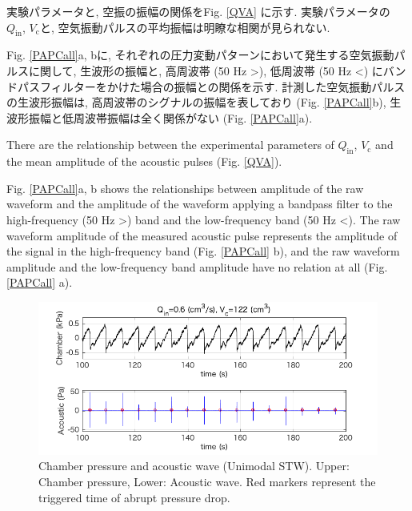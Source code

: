 \documentclass[12pt]{article}
\begin{document}
実験パラメータと, 空振の振幅の関係をFig. \ref{QVA} に示す. 
実験パラメータの $Q_\mathrm{in}$, $V_\mathrm{c}$と, 空気振動パルスの平均振幅は明瞭な相関が見られない. 

Fig. \ref{PAPCall}a, bに, それぞれの圧力変動パターンにおいて発生する空気振動パルスに関して, 生波形の振幅と, 高周波帯 (50 Hz >), 低周波帯 (50 Hz <) にバンドパスフィルターをかけた場合の振幅との関係を示す. 
計測した空気振動パルスの生波形振幅は, 高周波帯のシグナルの振幅を表しており (Fig. \ref{PAPCall}b), 生波形振幅と低周波帯振幅は全く関係がない (Fig. \ref{PAPCall}a). 

There are the relationship between the experimental parameters of $Q_\mathrm{in}$, $V_\mathrm{c}$ and the mean amplitude of the acoustic pulses (Fig. \ref{QVA}).

Fig. \ref{PAPCall}a, b shows the relationships between amplitude of the raw waveform and the amplitude of the waveform applying a bandpass filter to the high-frequency (50 Hz >) band and the low-frequency band (50 Hz <).
The raw waveform amplitude of the measured acoustic pulse represents the amplitude of the signal in the high-frequency band (Fig. \ref {PAPCall} b), and the raw waveform amplitude and the low-frequency band amplitude have no relation at all (Fig. \ref{PAPCall} a).


\clearpage
\begin{figure}[H]
\begin{center}
\includegraphics[scale=1] {MonoPAtime.png} 
\caption{Chamber pressure and acoustic wave (Unimodal STW). Upper: Chamber pressure, Lower: Acoustic wave. Red markers represent the triggered time of abrupt pressure drop.}
\label{MonoPAtime}
\end{center}
\end{figure} 
\end{document}

